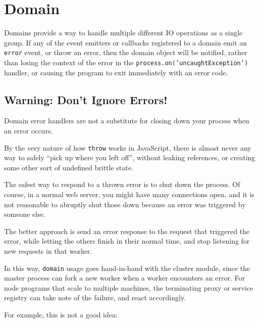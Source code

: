 \section{Domain}\label{domain}

\begin{Shaded}
\begin{Highlighting}[]
 
\end{Highlighting}
\end{Shaded}

Domains provide a way to handle multiple different IO operations as a
single group. If any of the event emitters or callbacks registered to a
domain emit an \texttt{error} event, or throw an error, then the domain
object will be notified, rather than losing the context of the error in
the \texttt{process.on('uncaughtException')} handler, or causing the
program to exit immediately with an error code.

\subsection{Warning: Don't Ignore
Errors!}\label{warning-dont-ignore-errors}

Domain error handlers are not a substitute for closing down your process
when an error occurs.

By the very nature of how \texttt{throw} works in JavaScript, there is
almost never any way to safely ``pick up where you left off'', without
leaking references, or creating some other sort of undefined brittle
state.

The safest way to respond to a thrown error is to shut down the process.
Of course, in a normal web server, you might have many connections open,
and it is not reasonable to abruptly shut those down because an error
was triggered by someone else.

The better approach is send an error response to the request that
triggered the error, while letting the others finish in their normal
time, and stop listening for new requests in that worker.

In this way, \texttt{domain} usage goes hand-in-hand with the cluster
module, since the master process can fork a new worker when a worker
encounters an error. For node programs that scale to multiple machines,
the terminating proxy or service registry can take note of the failure,
and react accordingly.

For example, this is not a good idea:

